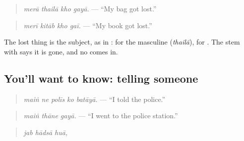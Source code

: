\begin{quote}
\textbf{   }
\end{quote}

\begin{quote}
\emph{merā thailā kho gayā.} — \textquotedblleft{}My bag got lost.\textquotedblright{}
\end{quote}

\begin{quote}
\textbf{   }
\end{quote}

\begin{quote}
\emph{merī kitāb kho gaī.} — \textquotedblleft{}My book got lost.\textquotedblright{}
\end{quote}

The lost thing is the subject, as in \textbf{  }: \textbf{} for the masculine \textbf{} (\emph{thailā}), \textbf{} for \textbf{}. The stem with \textbf{} says it is gone, and no \textbf{} comes in.

\subsection*{You'll want to know: telling someone}
\begin{quote}
\textbf{    }
\end{quote}

\begin{quote}
\emph{maiṅ ne polīs ko batāyā.} — \textquotedblleft{}I told the police.\textquotedblright{}
\end{quote}

\begin{quote}
\textbf{  }
\end{quote}

\begin{quote}
\emph{maiṅ thāne gayā.} — \textquotedblleft{}I went to the police station.\textquotedblright{}
\end{quote}

\begin{quote}
\textbf{  }
\end{quote}

\begin{quote}
\emph{jab hādsā huā,}
\end{quote}

